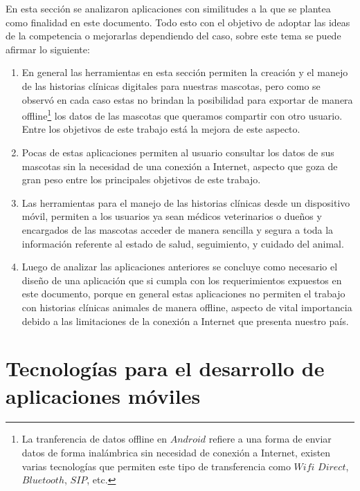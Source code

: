 En esta sección se analizaron aplicaciones con similitudes a la que se plantea como finalidad en este documento. Todo esto con el objetivo de adoptar las ideas de la competencia o mejorarlas dependiendo del caso, sobre este tema se puede afirmar lo siguiente:

\begin{enumerate}


\item	En general las herramientas en esta sección permiten la creación y el manejo de las historias clínicas digitales para nuestras mascotas, pero como se observó en cada caso estas no brindan la posibilidad para exportar de manera offline\footnote{La tranferencia de datos offline en $Android$ refiere a una forma de enviar datos de forma inalámbrica sin necesidad de conexión a Internet, existen varias tecnologías que permiten este tipo de transferencia como $Wifi$ $Direct$, $Bluetooth$, $SIP$, etc.}  los datos de las mascotas que queramos compartir con otro usuario. Entre los objetivos de este trabajo está la mejora de este aspecto.



\item	Pocas de estas aplicaciones permiten al usuario consultar los datos de sus mascotas sin la necesidad de una conexión a Internet, aspecto que goza de gran peso entre los principales objetivos de este trabajo.
\item	Las herramientas para el manejo de las historias clínicas desde un dispositivo móvil, permiten a los usuarios ya sean médicos veterinarios o dueños y encargados de las mascotas acceder de manera sencilla y segura a toda la información referente al estado de salud, seguimiento, y cuidado del animal.
\item	Luego de analizar las aplicaciones anteriores se concluye como necesario el diseño de una aplicación que si cumpla con los requerimientos expuestos en este documento, porque en general estas aplicaciones no permiten el trabajo con historias clínicas animales de manera offline, aspecto de vital importancia debido a las limitaciones de la conexión a Internet que presenta nuestro país.
\end{enumerate}

\section{Tecnologías para el desarrollo de aplicaciones móviles}\label{chapter:introduction}

